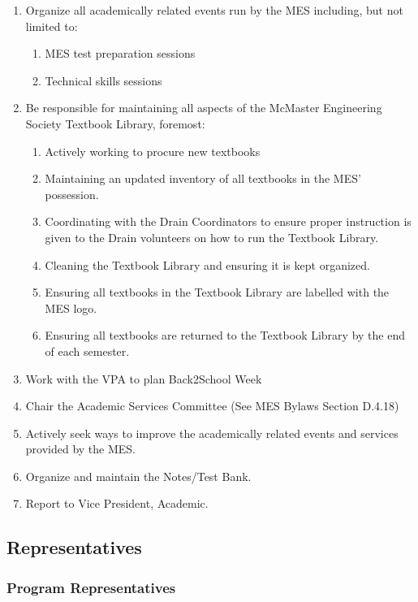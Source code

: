 \begin{enumerate}
 \item
  Organize all academically related events run by the MES including, but
  not limited to:

  \begin{enumerate}
   \item
    MES test preparation sessions
   \item
    Technical skills sessions
  \end{enumerate}
 \item
  Be responsible for maintaining all aspects of the McMaster Engineering
  Society Textbook Library, foremost:

  \begin{enumerate}
   \item
    Actively working to procure new textbooks
   \item
    Maintaining an updated inventory of all textbooks in the MES'
    possession.
   \item
    Coordinating with the Drain Coordinators to ensure proper
    instruction is given to the Drain volunteers on how to run the
    Textbook Library.
   \item
    Cleaning the Textbook Library and ensuring it is kept organized.
   \item
    Ensuring all textbooks in the Textbook Library are labelled with the
    MES logo.
   \item
    Ensuring all textbooks are returned to the Textbook Library by the
    end of each semester.
  \end{enumerate}
 \item
  Work with the VPA to plan Back2School Week
 \item
  Chair the Academic Services Committee (See MES Bylaws Section D.4.18)
 \item
  Actively seek ways to improve the academically related events and
  services provided by the MES.
 \item
  Organize and maintain the Notes/Test Bank.
 \item
  Report to Vice President, Academic.
\end{enumerate}

\hypertarget{representatives}{%
 \subsection{Representatives}
 \label{representatives}}
\hypertarget{program-representatives}{%
 \subsubsection{Program
  Representatives}
 \label{program-representatives}}

